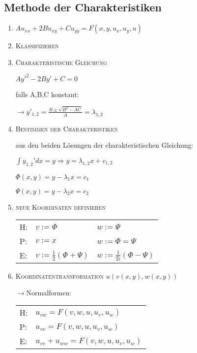 \documentclass[10pt,a4paper]{scrartcl}
\begin{document}
\begin{multicols*}{3}
	
	\finn
	
	\subsection{Methode der Charakteristiken}
	\begin{enumerate}
	
	\item
	$Au_{xx}+2Bu_{xy}+Cu_{yy}=F(x,y,u_x,u_y,u)$
	\item \scshape{Klassifizieren}
	\item \scshape{Charakteristische Gleichung}
	
	$Ay'^2-2By'+C=0$
	
	falls A,B,C konstant:
	
	$\rightarrow y'_{1,2}=\frac{B\pm\sqrt{B^2-AC}}{A}=\lambda_{1,2}$
	
	\item \scshape{Bestimmen der Charakteristiken}
	
	aus den beiden Lösungen der charakteristischen Gleichung:	
	
	$\int{y_{1,2}'dx}=y\Rightarrow y=\lambda_{1,2}x+c_{1,2}$
	
	$\Phi(x,y)=y-\lambda_1x=c_1$
	
	$\Psi(x,y)=y-\lambda_2x=c_2$
	
	\item \scshape{neue Koordinaten definieren}
	
	\begin{tabular}{lll}
	\hline
	H:&	$v:=\Phi$&	$w:=\Psi$\\
	P:&	$v:=x$&		$w:=\Phi=\Psi$\\
	E:&	$v:=\frac{1}{2}(\Phi+\Psi)$&		$w:=\frac{1}{2i}(\Phi-\Psi)$\\
	\hline
	\end{tabular}
	
	\item \scshape{Koordinatentransformation} $u(v(x,y),w(x,y))$
	
	$\rightarrow$Normalformen:
	
	\begin{tabular}{ll}
	\hline
	H:&		$u_{vw}=F(v,w,u,u_v,u_w)$\\
	P:&		$u_{vv}=F(v,w,u,u_v,u_w)$\\
	E:&		$u_{vv}+u_{ww}=F(v,w,u,u_v,u_w)$\\
	\hline
	\end{tabular}
	

\end{enumerate}
\end{multicols*}
\end{document}
